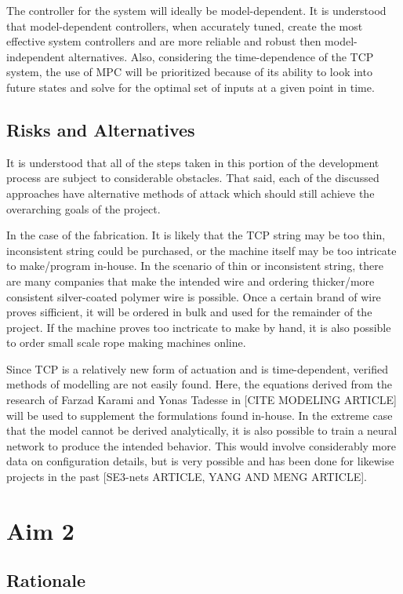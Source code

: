 The controller for the system will ideally be model-dependent. It is understood that model-dependent controllers, when accurately tuned, create the most effective system controllers and are more reliable and robust then model-independent alternatives. Also, considering the time-dependence of the TCP system, the use of MPC will be prioritized because of its ability to look into future states and solve for the optimal set of inputs at a given point in time.

\subsection{Risks and Alternatives}

It is understood that all of the steps taken in this portion of the development process are subject to considerable obstacles. That said, each of the discussed approaches have alternative methods of attack which should still achieve the overarching goals of the project.

In the case of the fabrication. It is likely that the TCP string may be too thin, inconsistent string could be purchased, or the machine itself may be too intricate to make/program in-house. In the scenario of thin or inconsistent string, there are many companies that make the intended wire and ordering thicker/more consistent silver-coated polymer wire is possible. Once a certain brand of wire proves sifficient, it will be ordered in bulk and used for the remainder of the project. If the machine proves too inctricate to make by hand, it is also possible to order small scale rope making machines online.

Since TCP is a relatively new form of actuation and is time-dependent, verified methods of modelling are not easily found. Here, the equations derived from the research of Farzad Karami and Yonas Tadesse in [CITE MODELING ARTICLE] will be used to supplement the formulations found in-house. In the extreme case that the model cannot be derived analytically, it is also possible to train a neural network to produce the intended behavior. This would involve considerably more data on configuration details, but is very possible and has been done for likewise projects in the past [SE3-nets ARTICLE, YANG AND MENG ARTICLE].

\section{Aim 2}

\subsection{Rationale}

